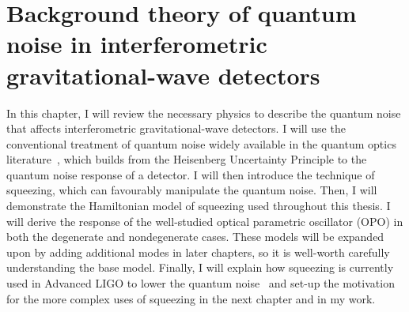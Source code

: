 \chapter{Background theory of quantum noise in interferometric gravitational-wave detectors} %
\label{chp:background_theory}





In this chapter, I will review the necessary physics to describe the quantum noise that affects interferometric gravitational-wave detectors. I will use the conventional treatment of quantum noise widely available in the quantum optics literature~\cite{Danilishin,MiaoQCRB}, which builds from the Heisenberg Uncertainty Principle to the quantum noise response of a detector. 
I will then introduce the technique of squeezing, which can favourably manipulate the quantum noise. Then, I will demonstrate the Hamiltonian model of squeezing used throughout this thesis. I will derive the response of the well-studied optical parametric oscillator (OPO) in both the degenerate and nondegenerate cases. These models will be expanded upon by adding additional modes in later chapters, so it is well-worth carefully understanding the base model. Finally, I will explain how squeezing is currently used in Advanced LIGO to lower the quantum noise~\cite{} and set-up the motivation for the more complex uses of squeezing in the next chapter and in my work.



